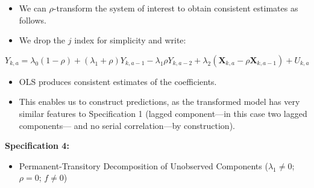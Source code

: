 \documentclass[static]{JJH-Beamer}
\begin{document}
\begin{frame}
 \addtocounter{framenumber}{-1}

\begin{itemize}
\item We can $\rho$-transform the system of interest to obtain consistent estimates as follows.
\item We drop the $j$ index for simplicity and write:
\end{itemize}

\begin{equation}
Y_{k,a} = \lambda_{0} \left( 1 - \rho \right) + \left( \lambda_{1} + \rho \right) Y_{k,a-1} - \lambda_{1} \rho Y_{k,a-2} + \lambda_{2} \left( \bm{X}_{k,a} - \rho \bm{X}_{k,a-1}  \right) + U_{k,a} \label{eq:rhotransform}
\end{equation}

\begin{itemize}
\item OLS produces consistent estimates of the coefficients.
\item This enables us to construct predictions, as the transformed model has very similar features to Specification 1 (lagged component---in this case two lagged components--- and no serial correlation---by construction).
\end{itemize}

\end{frame}

\begin{frame}
 \addtocounter{framenumber}{-1}

\textbf{Specification 4:}

\begin{itemize}
\item Permanent-Transitory Decomposition of Unobserved Components ($\lambda_{1} \neq 0$; $\rho = 0$; $f \neq 0$)
\end{itemize}

\end{frame}
\end{document}
